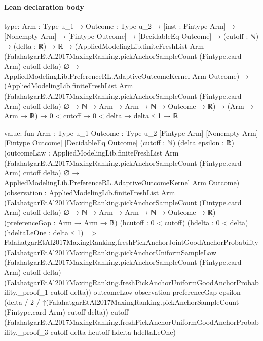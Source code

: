 \documentclass[10pt]{article}
\begin{document}
\paragraph{Lean declaration body}
\begin{ReviewVerbatim}
type:
{Arm : Type u_1} →
  {Outcome : Type u_2} →
    [inst : Fintype Arm] →
      [Nonempty Arm] →
        [Fintype Outcome] →
          [DecidableEq Outcome] →
            (cutoff : ℕ) →
              (delta : ℝ) →
                ℝ →
                  (AppliedModelingLib.finiteFreshList Arm
                        (FalahatgarEtAl2017MaxingRanking.pickAnchorSampleCount (Fintype.card Arm) cutoff delta) ∅ →
                      AppliedModelingLib.PreferenceRL.AdaptiveOutcomeKernel Arm Outcome) →
                    (AppliedModelingLib.finiteFreshList Arm
                          (FalahatgarEtAl2017MaxingRanking.pickAnchorSampleCount (Fintype.card Arm) cutoff delta) ∅ →
                        ℕ → Arm → Arm → ℕ → Outcome → ℝ) →
                      (Arm → Arm → ℝ) → 0 < cutoff → 0 < delta → delta ≤ 1 → ℝ

value:
fun {Arm : Type u_1} {Outcome : Type u_2} [Fintype Arm] [Nonempty Arm] [Fintype Outcome] [DecidableEq Outcome]
    (cutoff : ℕ) (delta epsilon : ℝ)
    (outcomeLaw :
      AppliedModelingLib.finiteFreshList Arm
          (FalahatgarEtAl2017MaxingRanking.pickAnchorSampleCount (Fintype.card Arm) cutoff delta) ∅ →
        AppliedModelingLib.PreferenceRL.AdaptiveOutcomeKernel Arm Outcome)
    (observation :
      AppliedModelingLib.finiteFreshList Arm
          (FalahatgarEtAl2017MaxingRanking.pickAnchorSampleCount (Fintype.card Arm) cutoff delta) ∅ →
        ℕ → Arm → Arm → ℕ → Outcome → ℝ)
    (preferenceGap : Arm → Arm → ℝ) (hcutoff : 0 < cutoff) (hdelta : 0 < delta) (hdeltaLeOne : delta ≤ 1) =>
  FalahatgarEtAl2017MaxingRanking.freshPickAnchorJointGoodAnchorProbability
    (FalahatgarEtAl2017MaxingRanking.pickAnchorUniformSampleLaw
      (FalahatgarEtAl2017MaxingRanking.pickAnchorSampleCount (Fintype.card Arm) cutoff delta)
      (FalahatgarEtAl2017MaxingRanking.freshPickAnchorUniformGoodAnchorProbability._proof_1 cutoff delta))
    outcomeLaw observation preferenceGap epsilon
    (delta / 2 / ↑(FalahatgarEtAl2017MaxingRanking.pickAnchorSampleCount (Fintype.card Arm) cutoff delta)) cutoff
    (FalahatgarEtAl2017MaxingRanking.freshPickAnchorUniformGoodAnchorProbability._proof_3 cutoff delta hcutoff hdelta
      hdeltaLeOne)
\end{ReviewVerbatim}
\end{document}
